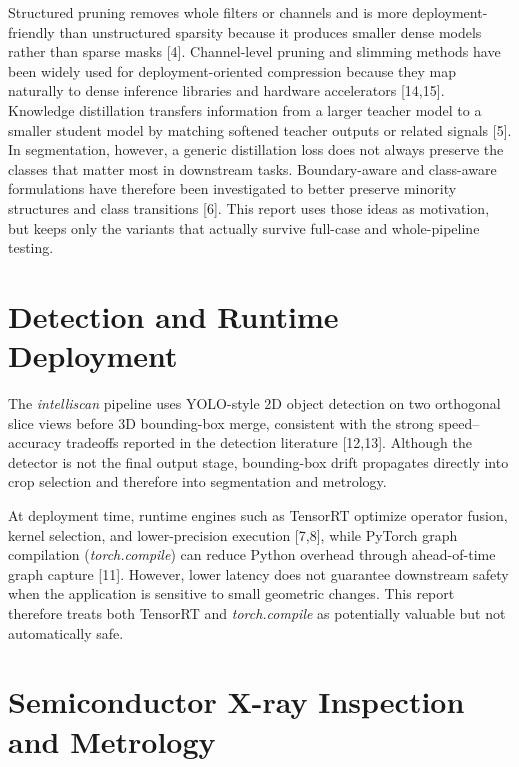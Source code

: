 Structured pruning removes whole filters or channels and is more
deployment-friendly than unstructured sparsity because it produces
smaller dense models rather than sparse masks {[}4{]}. Channel-level
pruning and slimming methods have been widely used for
deployment-oriented compression because they map naturally to dense
inference libraries and hardware accelerators {[}14,15{]}. Knowledge
distillation transfers information from a larger teacher model to a
smaller student model by matching softened teacher outputs or related
signals {[}5{]}. In segmentation, however, a generic distillation loss
does not always preserve the classes that matter most in downstream
tasks. Boundary-aware and class-aware formulations have therefore been
investigated to better preserve minority structures and class
transitions {[}6{]}. This report uses those ideas as motivation, but
keeps only the variants that actually survive full-case and
whole-pipeline testing.

\hypertarget{detection-and-runtime-deployment}{%
\section{Detection and Runtime Deployment}\label{detection-and-runtime-deployment}}

The \emph{intelliscan} pipeline uses YOLO-style 2D object detection on two orthogonal slice views before 3D bounding-box merge, consistent with the strong speed--accuracy tradeoffs reported in the detection literature {[}12,13{]}. Although the detector is not the final output stage, bounding-box drift propagates directly into crop selection and therefore into segmentation and metrology.

At deployment time, runtime engines such as TensorRT optimize operator fusion, kernel selection, and lower-precision execution {[}7,8{]}, while PyTorch graph compilation (\emph{torch.compile}) can reduce Python overhead through ahead-of-time graph capture {[}11{]}. However, lower latency does not guarantee downstream safety when the application is sensitive to small geometric changes. This report therefore treats both TensorRT and \emph{torch.compile} as potentially valuable but not automatically safe.

\hypertarget{semiconductor-x-ray-inspection-and-metrology}{%
\section{Semiconductor X-ray Inspection and
Metrology}\label{semiconductor-x-ray-inspection-and-metrology}}

